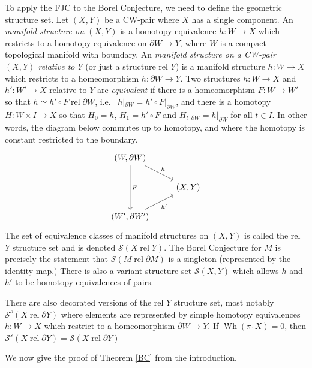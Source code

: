 \documentclass[12pt]{amsart}
\theoremstyle{definition}
\DeclareMathOperator{\rel}{rel}
\DeclareMathOperator{\Wh}{Wh}
\newcommand{\cS}{\mathcal S}
\begin{document}
To apply the FJC to the Borel Conjecture, we need to define the geometric structure set.   Let $(X,Y)$ be a CW-pair where $X$ has a single component.   
An {\em manifold structure on $(X,Y)$} is a  homotopy equivalence $h : W \to X$ which restricts to a  homotopy equivalence on $\partial W \to Y$, where $W$ is a compact topological manifold with boundary.
An {\em manifold structure on a CW-pair $(X,Y)$ relative to $Y$} (or just a structure rel $Y$) is a manifold structure $h: W \to X$  which restricts to a homeomorphism $h : \partial W \to Y$.  Two  structures   $h: W \to X$ and $h': W' \to X$ relative to $Y$ are {\em equivalent}  if there is a homeomorphism $F :W \to W'$ so that $h \simeq h' \circ F \rel \partial W$, i.e.~ $h|_{\partial  W} = h' \circ F |_{\partial  W}$, and there is a homotopy $H : W \times I \to X$ so that $H_0 = h$, $H_1 = h' \circ F$ and $H_t|_{\partial W} = h|_{\partial W}$ for all $t \in I$.
In other words, the diagram below commutes up to homotopy, and where the homotopy is constant restricted to the boundary.
$$
\begin{tikzcd}
(W, \partial W) \arrow[dd,"F"] \arrow[dr,"h"] & \\
& (X,Y) \\
(W', \partial W') \arrow[ur,"h'" ']
\end{tikzcd}
$$
The set of equivalence classes of manifold structures on $(X,Y)$ is called the rel $Y$ structure set and is denoted
$
\cS(X \rel Y).
$
The Borel Conjecture for $M$ is precisely the statement that $\cS(M \rel \partial M)$ is a singleton (represented by the identity map.)   There is also a variant  structure set $\cS(X,Y)$ which allows $h$ and $h'$ to be homotopy equivalences of pairs.   

There are also decorated versions of the rel $Y$ structure set, most notably $\cS^s(X \rel \partial Y)$ where elements are represented by simple homotopy equivalences $h : W \to X$ which restrict to a homeomorphism $\partial W \to Y$.    If $\Wh(\pi_1X) = 0$, then $\cS^s(X \rel \partial Y) = \cS(X \rel \partial Y)$ 




We now give the proof of Theorem \ref{BC} from the introduction.
\end{document}
